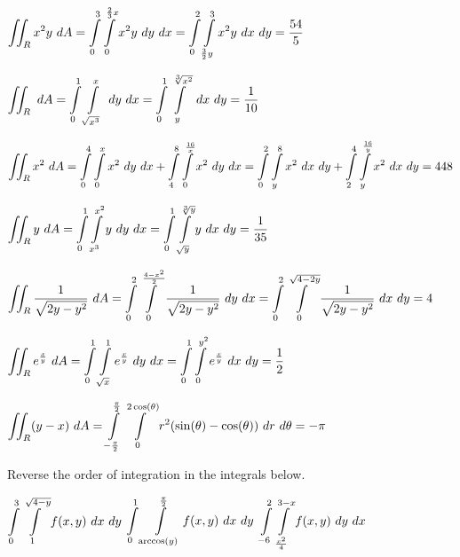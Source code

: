 \begin{Answer}
    
    
        \Question $\displaystyle \iint_R x^2 y \ dA = \displaystyle \int\limits_{0}^3\int\limits_{0}^{\frac{2}{3}x} x^2 y \ dy\ dx = \displaystyle \int\limits_{0}^2\int\limits_{\frac{3}{2}y}^{3} x^2 y  \ dx\ dy  = \dfrac{54}{5}$
    
         \Question $\displaystyle \iint_R\ dA = \displaystyle \int\limits_{0}^1\int\limits_{\sqrt{x^3}}^{x} \ dy\ dx = \displaystyle \int\limits_{0}^1\int\limits_{y}^{\sqrt[3]{x^2}} \ dx\ dy  = \dfrac{1}{10}$
        
        \Question $\displaystyle \iint_R x^2 \ dA =  \displaystyle \int\limits_{0}^4\int\limits_{0}^{x} x^2 \ dy\ dx + \displaystyle \int\limits_{4}^8\int\limits_{0}^{\frac{16}{x}} x^2 \ dy\ dx  = \displaystyle \int\limits_{0}^2\int\limits_{y}^{8}x^2  \ dx\ dy +  \displaystyle \int\limits_{2}^4\int\limits_{y}^{\frac{16}{y}}x^2  \ dx\ dy  = 448$ 
        
         \Question $\displaystyle \iint_R y\ dA = \displaystyle \int\limits_{0}^1\int\limits_{x^3}^{x^2} y\ dy\ dx = \displaystyle \int\limits_{0}^1\int\limits_{\sqrt{y}}^{\sqrt[3]{y}} y\ dx\ dy  = \dfrac{1}{35}$ 
         
        \Question $\ds \iint_R \dfrac{1}{\sqrt{2y-y^2}} \ dA  = \ds \int\limits_{0}^2\int\limits_{0}^{\frac{4-x^2}{2}} \dfrac{1}{\sqrt{2y-y^2}}\ dy\ dx = \ds \int\limits_{0}^2\int\limits_{0}^{\sqrt{4-2y}} \dfrac{1}{\sqrt{2y-y^2}}\ dx\ dy  = 4 $ 
    
       \Question $\displaystyle \iint_R e^{\frac{x}{y}} \ dA = \displaystyle\int\limits_{0}^1\int\limits_{\sqrt{x}}^1 e^{\frac{x}{y}}\ dy\ dx = \displaystyle\int\limits_{0}^1\int\limits_{0}^{y^2} e^{\frac{x}{y}}\ dx\ dy = \dfrac{1}{2}$ 
    
        \Question $\displaystyle \iint_R (y-x) \ dA = \displaystyle\int\limits_{-\frac{\pi}{2}}^{\frac{\pi}{2}}\int\limits_{0}^{2\cos(\theta)} r^2(\sin(\theta)-\cos(\theta))\ dr\ d\theta = -\pi$    
    
\end{Answer} 

\pagebreak
\begin{Exercise} Reverse the order of integration  in the integrals below.
    \begin{multicols}{2}
         \Question[difficulty = 1] $\displaystyle \int\limits_{0}^3\int\limits_{1}^{\sqrt{4-y}} f(x,y)\ dx\ dy$
         \Question[difficulty = 2] $\ds \int\limits_{0}^1\int\limits_{\arccos(y)}^{\frac{\pi}{2}} f(x,y)\ dx\ dy$
         \Question[difficulty = 3] $\ds \int\limits_{-6}^2\int\limits_{\frac{x^2}{4}}^{3-x} f(x,y)\ dy\ dx$
         \EndCurrentQuestion
    \end{multicols}
\end{Exercise}

